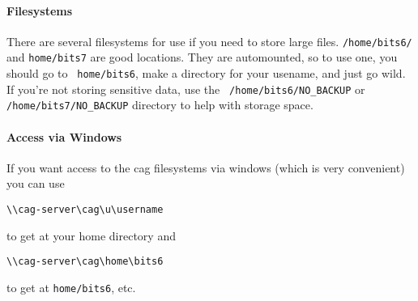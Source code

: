 \paragraph{Filesystems}
There are several filesystems for use if you need to store large
files.  {\tt /home/bits6/} and {\tt home/bits7} are good locations.
They are automounted, so to use one, you should go to {\tt
  home/bits6}, make a directory for your usename, and just go wild.
If you're not storing sensitive data, use the {\tt
  /home/bits6\slash{}NO\_BACKUP} or {\tt /home/bits7/NO\_BACKUP}
directory to help with storage space.

\paragraph{Access via Windows}
If you want access to the cag filesystems via windows
(which is very convenient) you can use
\begin{verbatim}
\\cag-server\cag\u\username
\end{verbatim}
to get at your home directory and 
\begin{verbatim}
\\cag-server\cag\home\bits6
\end{verbatim}
 to get at {\tt home/bits6}, etc.


